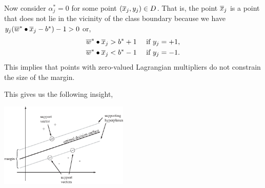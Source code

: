 \documentclass[a4paper,blends,pdf,colorBG,slideColor]{prosper}
\begin{document}
Now consider $\alpha^*_j = 0$ for some point $(\overline{x}_j,y_j)\in D$.
That is, the point $\overline{x}_j$ is a point that does not lie in the vicinity of the class boundary
because we have $y_j(\overline{w}^*\bullet\overline{x}_j-b^*) - 1 > 0$ or,
\begin{align*}
\overline{w}^*\bullet\overline{x}_j & > b^* + 1 \quad\text{ if $y_j = +1$},\\
\overline{w}^*\bullet\overline{x}_j & < b^* - 1 \quad\text{ if $y_j = -1$}.
\end{align*}
This implies that points with zero-valued Lagrangian multipliers do not constrain the size of the 
margin.

\begin{center}
\end{center}
\es

This gives us the following insight,
\vspace{.2in}
\begin{center}
\includegraphics[height=40mm]{figures/fig06-03.eps}
\end{center}


\es
\end{document}
